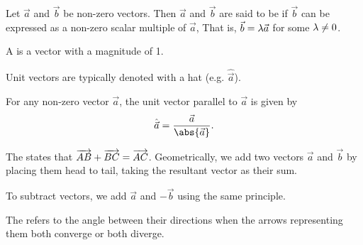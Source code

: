 \begin{definition}
    Let $\vec a$ and $\vec b$ be non-zero vectors. Then $\vec a$ and $\vec b$ are said to be  if $\vec b$ can be expressed as a non-zero scalar multiple of $\vec a$, That is, $\vec b = \lambda \vec a$ for some $\lambda \neq 0$.
\end{definition}

\begin{definition}
    A  is a vector with a magnitude of 1.
\end{definition}

Unit vectors are typically denoted with a hat (e.g. $\hat{\vec a}$).

For any non-zero vector $\vec a$, the unit vector parallel to $\vec a$ is given by \[\hat{\vec a} = \frac{\vec a}{\abs{\vec a}}.\]

\begin{definition}
    The  states that $\overrightarrow{AB} + \overrightarrow{BC} = \overrightarrow{AC}$. Geometrically, we add two vectors $\vec a$ and $\vec b$ by placing them head to tail, taking the resultant vector as their sum.

    \begin{figure}[H]
        \centering
        \caption{}
    \end{figure}
\end{definition}

To subtract vectors, we add $\vec a$ and $-\vec b$ using the same principle.

\begin{definition}
    The  refers to the angle between their directions when the arrows representing them both converge or both diverge.
\end{definition}

